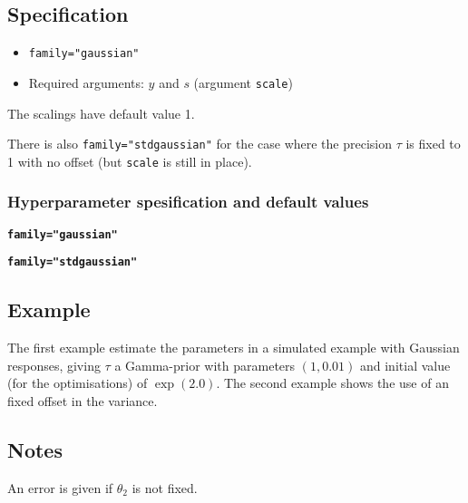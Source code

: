 \documentclass[a4paper,11pt]{article}
\begin{document}
\subsection*{Specification}

\begin{itemize}
\item \texttt{family="gaussian"}
\item Required arguments: $y$ and $s$ (argument \texttt{scale})
\end{itemize}
The scalings have default value 1.

There is also \texttt{family="stdgaussian"} for the case where the
precision $\tau$ is fixed to 1 with no offset (but \texttt{scale} is
still in place).

\subsubsection*{Hyperparameter spesification and default values}
\textbf{\texttt{family="gaussian"}}


\textbf{\texttt{family="stdgaussian"}}


\subsection*{Example}

The first example estimate the parameters in a simulated example with
Gaussian responses, giving $\tau$ a Gamma-prior with parameters
$(1, 0.01)$ and initial value (for the optimisations) of $\exp(2.0)$.
The second example shows the use of an fixed offset in the variance.


\subsection*{Notes}

An error is given if $\theta_2$ is not fixed. 
\end{document}
